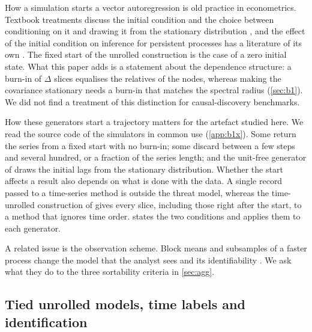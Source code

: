 \documentclass[pdflatex,sn-apa]{sn-jnl}
\theoremstyle{thmstyleone}
\theoremstyle{thmstylethree}
\theoremstyle{thmstyletwo}
\begin{document}
How a simulation starts a vector autoregression is old practice in
econometrics. Textbook treatments discuss the initial condition and the choice
between conditioning on it and drawing it from the stationary distribution
\citep{hamilton1994time,lutkepohl2005new,kilian2017structural}, and the effect
of the initial condition on inference for persistent processes has a literature
of its own \citep{muller2003tests}. The fixed start of the unrolled construction
is the case of a zero initial state. What this paper adds is a statement about
the dependence structure: a burn-in of $\Delta$ slices equalises the relatives
of the nodes, whereas making the covariance stationary needs a burn-in that
matches the spectral radius (\cref{sec:b1}). We did not find a treatment of
this distinction for causal-discovery benchmarks.

How these generators start a trajectory matters for the artefact studied here.
We read the source code of the simulators in common use (\cref{app:b1x}). Some
return the series from a fixed start with no burn-in; some discard between a few
steps and several hundred, or a fraction of the series length; and the
unit-free generator of \citet{herman2025unitless} draws the initial lags from
the stationary distribution. Whether the start affects a result also depends on
what is done with the data. A single record passed to a time-series method is
outside the threat model, whereas the time-unrolled construction of
\citet{reisach2026topological} gives every slice, including those right after
the start, to a method that ignores time order.  states the two
conditions and applies them to each generator.

A related issue is the observation scheme. Block means and subsamples of a
faster process change the model that the analyst sees
\citep{weiss1984systematic,breitung2002temporal} and its identifiability
\citep{gong2015subsampled,hyttinen2016subsampled,gong2017aggregated}. We ask what
they do to the three sortability criteria in \cref{sec:agg}.

\subsection{Tied unrolled models, time labels and identification}
\label{sec:rw-ident}
\end{document}
